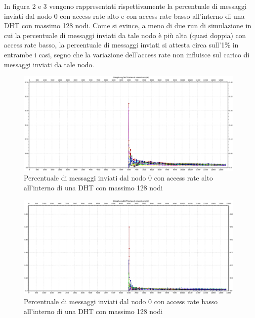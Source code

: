 \documentclass[	
	DIV=calc,
	paper=a4,
	fontsize=11pt,
	onecolumn
]{scrartcl} %
\begin{document}
	In figura 2 e 3 vengono rappresentati rispettivamente la percentuale di messaggi inviati dal nodo 0 con access rate alto e con access rate basso all'interno di una DHT con massimo 128 nodi. Come si evince, a meno di due run di simulazione in cui la percentuale di messaggi inviati da tale nodo è più alta (quasi doppia) con access rate basso, la percentuale di messaggi inviati si attesta circa sull'1\% in entrambe i casi, segno che la variazione dell'access rate non influisce sul carico di messaggi inviati da tale nodo.  
	
	\begin{figure}[H]
		\centering
		\includegraphics[scale=0.35]	{SymphonyDHT/plots/PercentageOfMessagesSent/128_Nodes_FastAccess/SymphonyDHT_128Nodes_FastAccess_Node0.png}
		\caption{Percentuale di messaggi inviati dal nodo 0 con access rate alto all'interno di una DHT con massimo 128 nodi}
		\label{Figura 2}
	\end{figure}
	\begin{figure}[H]
		\centering
		\includegraphics[scale=0.35]	{SymphonyDHT/plots/PercentageOfMessagesSent/128_Nodes_SlowAccess/SymphonyDHT_128Nodes_SlowAccess_Node0.png}
		\caption{Percentuale di messaggi inviati dal nodo 0 con access rate basso all'interno di una DHT con massimo 128 nodi}
		\label{Figura 3}
	\end{figure}
	
\end{document}
